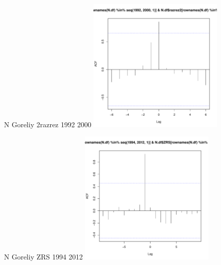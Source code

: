 \documentclass[12pt, a4paper]{disser}
\begin{document}
\begin{figure}[ht]
	\begin{minipage}[b]{.46\linewidth}
	\begin{center}
	{\tiny N Goreliy 2razrez 1992 2000}
	\includegraphics[width=65mm]{../White_Sea/dynamic_N_N1/crosscorr_N_Goreliy_2razrez_1992_2000.pdf}
	\end{center}
	\end{minipage}
%
	\hfil %
%
	\begin{minipage}[b]{.46\linewidth}
	\begin{center}	
	{\tiny N Goreliy ZRS 1994 2012}
	\includegraphics[width=65mm]{../White_Sea/dynamic_N_N1/crosscorr_N_Goreliy_ZRS_1994_2012.pdf}
	\end{center}
	\end{minipage}



\end{figure}
\end{document}
